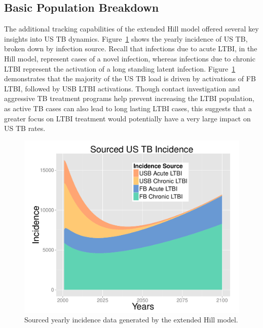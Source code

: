 \documentclass{amsart}
\renewcommand{\(}{\left(}
\renewcommand{\)}{\right)}
\begin{document}
\subsection{Basic Population Breakdown}
The additional tracking capabilities of the extended Hill model offered several
key insights into US TB dynamics. Figure~\ref{fig:incPlotSourced} shows the
yearly incidence of US TB, broken down by infection source. Recall that
infections due to acute LTBI, in the Hill model, represent cases of a novel
infection, whereas infections due to chronic LTBI represent the activation of a
long standing latent infection.  Figure~\ref{fig:incPlotSourced} demonstrates
that the majority of the US TB load is driven by activations of FB LTBI,
followed by USB LTBI activations. Though contact investigation and aggressive TB
treatment programs help prevent increasing the LTBI population, as active TB
cases can also lead to long lasting LTBI cases, this suggests that a greater
focus on LTBI treatment would potentially have a very large impact on US TB
rates. 
\begin{figure}[h]
  \begin{center}
    \includegraphics[scale=.5]{incPlotSourced}
  \end{center}
  \caption{Sourced yearly incidence data generated by the extended Hill model.}
  \label{fig:incPlotSourced}
\end{figure}
\end{document}
